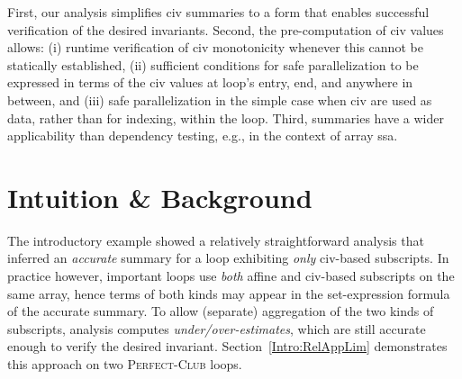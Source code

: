 \documentclass{sig-alternate}
\begin{document}
First, our analysis simplifies {\sc civ} summaries to a form 
that enables successful verification of the desired invariants. 
Second, the pre-computation of {\sc civ} values allows:
  (i) runtime verification of {\sc civ} monotonicity whenever 
          this cannot be statically established, 
 (ii) sufficient conditions for safe parallelization to 
          be expressed in terms of the {\sc civ} values at loop's 
          entry, end, and anywhere in between, and 
(iii) safe parallelization in the simple case when
        {\sc civ} are used as data, rather than for indexing,
        within the loop.
Third, summaries have a wider applicability than dependency testing,
e.g., in the context of array {\sc ssa}.






\section{Intuition \& Background}
\label{sec:Prelim}

The introductory example showed a relatively straightforward
analysis that inferred an {\em accurate} summary for a loop 
exhibiting {\em only} {\sc civ}-based subscripts.   
%
In practice however, important loops use {\em both} %
affine and {\sc civ}-based subscripts on the same array, 
hence terms of both kinds may appear in the set-expression 
formula of the accurate summary.
%
To allow (separate) aggregation of the two kinds of subscripts,
analysis computes {\em under/over-estimates}, which are still
accurate enough to verify the desired invariant.
%
Section~\ref{Intro:RelAppLim} demonstrates this approach 
on two \textsc{Perfect-Club} loops.
\end{document}
